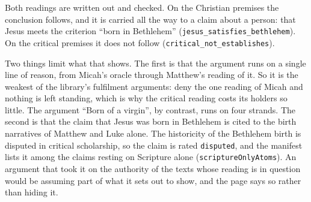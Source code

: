 \documentclass[11pt]{article}
\begin{document}
Both readings are written out and checked. On the Christian premises the conclusion follows, and it is carried all the way to a claim about a person: that Jesus meets the criterion “born in Bethlehem” (\texttt{jesus\_\allowbreak{}satisfies\_\allowbreak{}bethlehem}). On the critical premises it does not follow (\texttt{critical\_\allowbreak{}not\_\allowbreak{}establishes}).

Two things limit what that shows. The first is that the argument runs on a single line of reason, from Micah’s oracle through Matthew’s reading of it. So it is the weakest of the library’s fulfilment arguments: deny the one reading of Micah and nothing is left standing, which is why the critical reading costs its holders so little. The argument “Born of a virgin”, by contrast, runs on four strands. The second is that the claim that Jesus was born in Bethlehem is cited to the birth narratives of Matthew and Luke alone. The historicity of the Bethlehem birth is disputed in critical scholarship, so the claim is rated \texttt{disputed}, and the manifest lists it among the claims resting on Scripture alone (\texttt{scripture\allowbreak{}Only\allowbreak{}Atoms}). An argument that took it on the authority of the texts whose reading is in question would be assuming part of what it sets out to show, and the page says so rather than hiding it.
\end{document}
